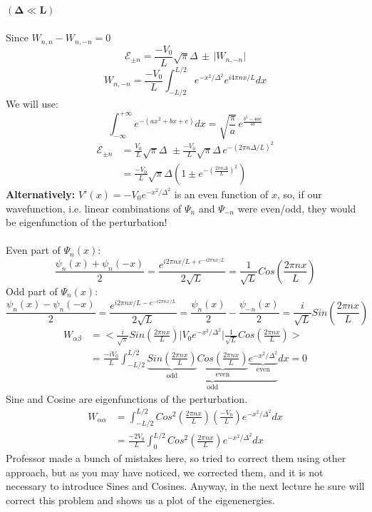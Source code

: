 \documentclass[12pt,fancychapters]{report}
\numberwithin{equation}{section}
\begin{document}
$\mathbf{(\Delta \ll L)}$\\
\\
Since $W_{n,n} - W_{n,-n} = 0$
\[\mathcal{E}_{\pm n} = \frac{-V_0}{L}\sqrt{\pi}\Delta \,\pm\, \big|W_{n,-n}\big|\]
\[W_{n,-n} = \frac{-V_0}{L}\int_{-L/2}^{L/2} e^{-x^2/\Delta^2} e^{i4\pi n x/L} dx\]
We will use:
\begin{equation}
\boxed{ \int_{-\infty}^{+\infty}e^{-(ax^2+bx+c)}dx = \sqrt{\frac{\pi}{a}}\,e^{\frac{b^2-4ac}{4a}} }
\end{equation}
\begin{align*}
  \mathcal{E}_{\pm n} &= \frac{V_0}{L}\sqrt{\pi}\Delta\,\,\pm\frac{-V_0}{L}\sqrt{\pi}\Delta\,
  e^{-(2\pi n \Delta/L)^2}\\
                      &= \boxed{\frac{-V_0}{L}\sqrt{\pi}\Delta\left(1 \pm e^{-\left(
                      \frac{2\pi n \Delta}{L}\right)^2}\right) }
\end{align*}
\textbf{Alternatively:} $V'(x) = -V_0 e^{-x^2/\Delta^2}$ is an even function of $x$, so, if
our wavefunction, i.e. linear combinations of $\Psi_n$ and $\Psi_{-n}$ were even/odd, they would 
be eigenfunction of the perturbation!\\
\\
Even part of $\Psi_n(x):$
\[
  \frac{\psi_n(x)+\psi_n(-x)}{2} = \frac{e^{i2\pi n x/L + e^{-i2\pi n x/L}}}{2\sqrt{L}}=
\frac{1}{\sqrt{L}}Cos\left(\frac{2\pi n x}{L}\right)
\]
Odd part of $\Psi_n(x):$
\[
   \frac{\psi_n(x)-\psi_n(-x)}{2} = \frac{e^{i2\pi n x/L - e^{-i2\pi n x/L}}}{2\sqrt{L}}=
   \frac{\psi_n(x)}{2}-\frac{\psi_{-n}(x)}{2}=
\frac{i}{\sqrt{L}}Sin\left(\frac{2\pi n x}{L}\right)
\]
\begin{align*}
  W_{\alpha\beta}&=\Bigg<\frac{i}{\sqrt{\pi}}Sin\left(\frac{2\pi n x}{L}\right)\Bigg| V_0 e^{
  -x^2/\Delta^2}\Bigg|\frac{1}{\sqrt{L}}Cos\left(\frac{2\pi n x}{L}\right)\Bigg>\\
                 &= \frac{-iV_0}{L}\int_{-L/2}^{L/2}\underbrace{\underbrace{Sin\left(\frac{2\pi n x}
                 {L}\right)}_\text{odd}
\underbrace{ Cos\left(\frac{2\pi n x}{L}\right)}_\text{even} \underbrace{e^{-x^2/\Delta^2
}}_\text{even}}_\text{odd} dx = 0
  \end{align*}
Sine and Cosine are eigenfunctions of the perturbation.
\begin{align*}
  W_{\alpha\alpha} &= \int_{-L/2}^{L/2}Cos^2\left(\frac{2\pi n x}{L}\right)\left(
  \frac{-V_0}{L}\right)e^{-x^2/\Delta^2} dx\\
  &= \frac{-2V_0}{L}\int_{0}^{L/2} Cos^2\left(\frac{2\pi n x}{L}\right) e^{-x^2/\Delta^2}dx
  \end{align*}
Professor made a bunch of mistakes here, so tried to correct them using other approach, but as 
you may have noticed, we corrected them, and it is not necessary to introduce Sines and Cosines.
Anyway, in the next lecture he sure will correct this problem and shows us a plot of the 
eigenenergies.
\newpage
\end{document}
